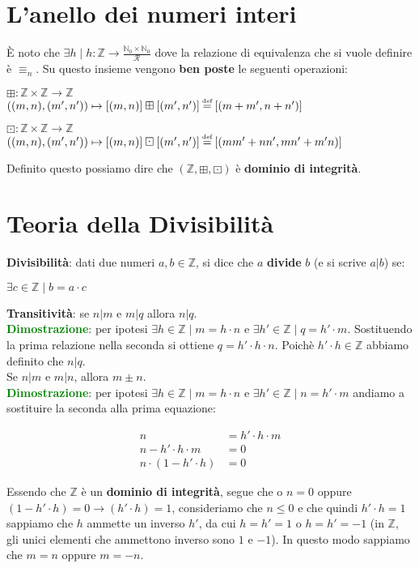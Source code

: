 \section{L'anello dei numeri interi}
È noto che $\exists h \; | \; h : \mathbb{Z} \rightarrow \frac{\mathbb{N}_0 \times \mathbb{N}_0}{\mathcal{R}}$ dove la relazione di equivalenza che si vuole definire è $\equiv_n$. Su questo insieme vengono \textbf{ben poste} le seguenti operazioni:
\begin{center}
    $\boxplus : \mathbb{Z} \times \mathbb{Z} \rightarrow \mathbb{Z}$ \\
    $((m, n), (m', n')) \mapsto [(m, n)] \boxplus [(m', n')] \myeq [(m + m', n + n')]$

    $\boxdot : \mathbb{Z} \times \mathbb{Z} \rightarrow \mathbb{Z}$ \\
    $((m, n), (m', n')) \mapsto [(m, n)] \boxdot [(m', n')] \myeq [(mm' + nn', mn' + m'n)]$
\end{center}
Definito questo possiamo dire che $(\mathbb{Z}, \boxplus, \boxdot)$ è \textbf{dominio di integrità}.

\section{Teoria della Divisibilità}
\textbf{Divisibilità}: dati due numeri $a,b \in \mathbb{Z}$, si dice che $a$ \textbf{divide} $b$ (e si scrive $a|b$) se:
\begin{center}
    $\exists c \in \mathbb{Z} \; | \; b = a \cdot c$
\end{center}
\textbf{Transitività}: se $n|m$ e $m|q$ allora $n|q$. \\
\textcolor{green}{\textbf{Dimostrazione}}: per ipotesi $\exists h \in \mathbb{Z} \; | \; m = h \cdot n$ e $\exists h' \in \mathbb{Z} \; | \; q = h' \cdot m$. Sostituendo la prima relazione nella seconda si ottiene $q = h' \cdot h \cdot n$. Poichè $h' \cdot h \in \mathbb{Z}$ abbiamo definito che $n|q$. \\ \newline
Se $n|m$ e $m|n$, allora $m \pm n$. \\
\textcolor{green}{\textbf{Dimostrazione}}: per ipotesi $\exists h \in \mathbb{Z} \; | \; m = h \cdot n$ e $\exists h' \in \mathbb{Z} \; | \; n = h' \cdot m$ andiamo a sostituire la seconda alla prima equazione:
\begin{center}
    \begin{align*}
        n &= h' \cdot h \cdot m \\
        n - h' \cdot h \cdot m &= 0 \\
        n \cdot (1 - h' \cdot h) &= 0
    \end{align*}
\end{center}
Essendo che $\mathbb{Z}$ è un \textbf{dominio di integrità}, segue che o $n = 0$ oppure $(1 - h' \cdot h) = 0 \rightarrow (h' \cdot h) = 1$, consideriamo che $n \leq 0$ e che quindi $h' \cdot h = 1$ sappiamo che $h$ ammette un inverso $h'$, da cui $h = h' = 1$ o $h = h' = -1$ (in $\mathbb{Z}$, gli unici elementi che ammettono inverso sono $1$ e $-1$). In questo modo sappiamo che $m=n$ oppure $m=-n$.

